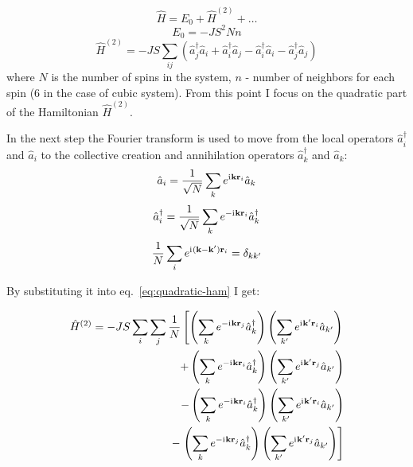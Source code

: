 \begin{equation}
    \hat{H} = E_0 + \hat{H}^{(2)} + \dots 
\end{equation}
\begin{equation}
    E_0 = -JS^2Nn \label{eq:zero-energy}
\end{equation}
\begin{equation}
    \hat{H}^{(2)} = -JS \sum_{ij} \left(\hat{a}_j^{\dag}\hat{a}_i + \hat{a}_i^{\dag}\hat{a}_j - 
    \hat{a}_i^{\dag}\hat{a}_i - \hat{a}_j^{\dag}\hat{a}_j\right)
    \label{eq:quadratic-ham}
\end{equation}
where $N$ is the number of spins in the system, $n$ - number of neighbors for each spin ($6$ in the case of cubic system).
From this point I focus on the quadratic part of the Hamiltonian $\hat{H}^{(2)}$.

In the next step the Fourier transform is used to move from the local operators $\hat{a}_i^{\dag}$ and $\hat{a}_i$
to the collective creation and annihilation operators $\hat{a}_k^{\dag}$ and $\hat{a}_k$:
\begin{equation}
    \hat{a}_i = \dfrac{1}{\sqrt{N}}\sum_k e^{\mathrm{i}\mkern1mu\mathbf{k}\mathbf{r}_i} \hat{a}_k 
\end{equation}
\begin{equation}
    \hat{a}_i^{\dag} = \dfrac{1}{\sqrt{N}}\sum_k e^{-\mathrm{i}\mkern1mu\mathbf{k}\mathbf{r}_i} \hat{a}_k^{\dag} 
\end{equation}
\begin{equation}
    \dfrac{1}{N}\sum_i e^{\mathrm{i}\mkern1mu(\mathbf{k} - \mathbf{k}^{\prime})\mathbf{r}_i} = \delta_{kk^{\prime}} 
\end{equation}

By substituting it into eq.~\eqref{eq:quadratic-ham} I get:

\begin{equation}
\begin{aligned}
    \hat{H}^{(2)}  = -JS \sum_i\sum_j \dfrac{1}{N}\left[
        \left(\sum_k e^{-\mathrm{i}\mkern1mu\mathbf{k}\mathbf{r}_j} \hat{a}_k^{\dag}\right)
        \left(\sum_{k^{\prime}} e^{\mathrm{i}\mkern1mu\mathbf{k^{\prime}}\mathbf{r}_i} \hat{a}_{k^{\prime}}\right)\right. \\
        +
        \left(\sum_k e^{-\mathrm{i}\mkern1mu\mathbf{k}\mathbf{r}_i} \hat{a}_k^{\dag}\right)
        \left(\sum_{k^{\prime}} e^{\mathrm{i}\mkern1mu\mathbf{k^{\prime}}\mathbf{r}_j} \hat{a}_{k^{\prime}}\right)  \\
        -
        \left(\sum_k e^{-\mathrm{i}\mkern1mu\mathbf{k}\mathbf{r}_i} \hat{a}_k^{\dag}\right)
        \left(\sum_{k^{\prime}} e^{\mathrm{i}\mkern1mu\mathbf{k^{\prime}}\mathbf{r}_i} \hat{a}_{k^{\prime}}\right)  \\
        -
        \left.\left(\sum_k e^{-\mathrm{i}\mkern1mu\mathbf{k}\mathbf{r}_j} \hat{a}_k^{\dag}\right)
        \left(\sum_{k^{\prime}} e^{\mathrm{i}\mkern1mu\mathbf{k^{\prime}}\mathbf{r}_j} \hat{a}_{k^{\prime}}\right) \right]
\end{aligned}
\end{equation}

